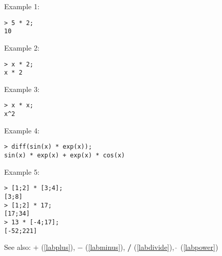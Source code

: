 \noindent Example 1: 
\begin{center}\begin{minipage}{15cm}\begin{Verbatim}[frame=single]
> 5 * 2;
10
\end{Verbatim}
\end{minipage}\end{center}
\noindent Example 2: 
\begin{center}\begin{minipage}{15cm}\begin{Verbatim}[frame=single]
> x * 2;
x * 2
\end{Verbatim}
\end{minipage}\end{center}
\noindent Example 3: 
\begin{center}\begin{minipage}{15cm}\begin{Verbatim}[frame=single]
> x * x;
x^2
\end{Verbatim}
\end{minipage}\end{center}
\noindent Example 4: 
\begin{center}\begin{minipage}{15cm}\begin{Verbatim}[frame=single]
> diff(sin(x) * exp(x));
sin(x) * exp(x) + exp(x) * cos(x)
\end{Verbatim}
\end{minipage}\end{center}
\noindent Example 5: 
\begin{center}\begin{minipage}{15cm}\begin{Verbatim}[frame=single]
> [1;2] * [3;4];
[3;8]
> [1;2] * 17;
[17;34]
> 13 * [-4;17];
[-52;221]
\end{Verbatim}
\end{minipage}\end{center}
See also: \textbf{$+$} (\ref{labplus}), \textbf{$-$} (\ref{labminus}), \textbf{/} (\ref{labdivide}), \textbf{$\mathbf{\hat{~}}$} (\ref{labpower})
